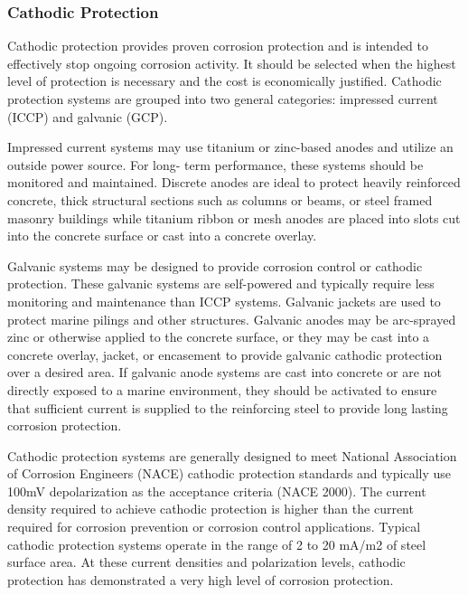 \subsubsection{Cathodic Protection}
Cathodic protection provides proven corrosion protection and is intended to effectively stop ongoing corrosion
activity. It should be selected when the highest level of protection is necessary and the cost is economically justified.
Cathodic protection systems are grouped into two general categories: impressed current (ICCP) and galvanic (GCP).

Impressed current systems may use titanium or zinc-based anodes and utilize an outside power source. For long-
term performance, these systems should be monitored and maintained. Discrete anodes are ideal to protect heavily
reinforced concrete, thick structural sections such as columns or beams, or steel framed masonry buildings while
titanium ribbon or mesh anodes are placed into slots cut into the concrete surface or cast into a concrete overlay.

Galvanic systems may be designed to provide corrosion control or cathodic protection. These galvanic systems
are self-powered and typically require less monitoring and maintenance than ICCP systems. Galvanic jackets are
used to protect marine pilings and other structures. Galvanic anodes may be arc-sprayed zinc or otherwise applied to
the concrete surface, or they may be cast into a concrete overlay, jacket, or encasement to provide galvanic cathodic
protection over a desired area. If galvanic anode systems are cast into concrete or are not directly exposed to a
marine environment, they should be activated to ensure that sufficient current is supplied to the reinforcing steel to
provide long lasting corrosion protection.

Cathodic protection systems are generally designed to meet National Association of Corrosion Engineers
(NACE) cathodic protection standards and typically use 100mV depolarization as the acceptance criteria (NACE
2000). The current density required to achieve cathodic protection is higher than the current required for corrosion
prevention or corrosion control applications. Typical cathodic protection systems operate in the range of 2 to 20
mA/m2 of steel surface area. At these current densities and polarization levels, cathodic protection has demonstrated
a very high level of corrosion protection.

